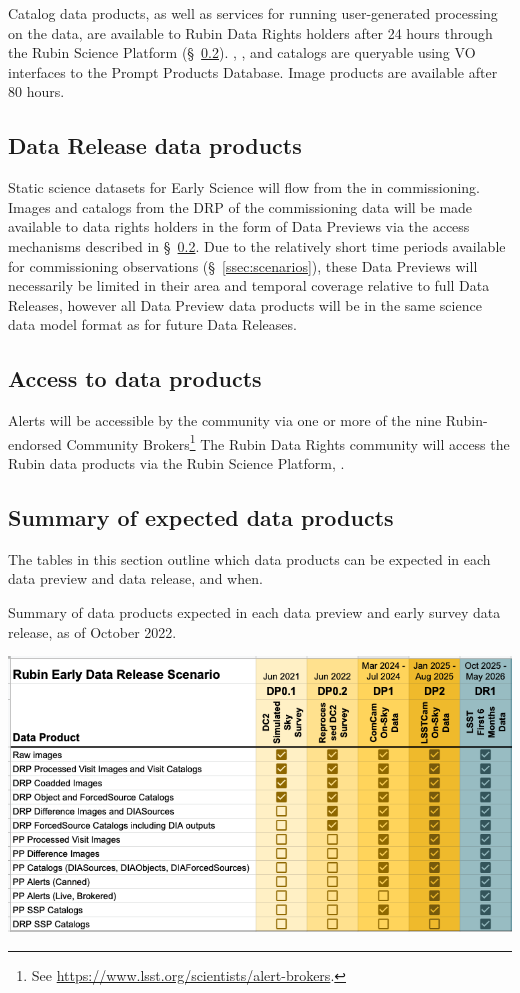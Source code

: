 Catalog data products, as well as services for running user-generated processing on the data, are available to Rubin Data Rights holders after 24 hours through the Rubin Science Platform (\S~\ref{ssec:dataaccess}).
\DIASource, \DIAObject, and \SSObject catalogs are queryable using VO interfaces to the Prompt Products Database.
Image products are available after 80 hours.


\subsection{Data Release data products}
Static science datasets for Early Science will flow from the \svs in commissioning.
Images and catalogs from the DRP of the commissioning data will be made available to data rights holders in the form of Data Previews via the access mechanisms described in \S~\ref{ssec:dataaccess}.
Due to the relatively short time periods available for commissioning observations (\S~\ref{ssec:scenarios}), these Data Previews will necessarily be limited in their area and temporal coverage relative to full Data Releases, however all Data Preview data products will be in the same science data model format as for future Data Releases.

\subsection{Access to \es data products}\label{ssec:dataaccess}
Alerts will be accessible by the community via one or more of the nine Rubin-endorsed Community Brokers\footnote{See \url{https://www.lsst.org/scientists/alert-brokers}.}
The Rubin Data Rights community will access the Rubin data products via the Rubin Science Platform, \citep{LSE-319}.

\subsection{Summary of expected \es data products}

The tables in this section outline which data products can be expected in each \es data preview and data release, and when.

\begin{table}
\caption{Summary of data products expected in each data preview and early survey data release, as of October 2022.}
\label{tab:summary}
\includegraphics[width=\linewidth]{figures/DPR-summary}
\end{table}

